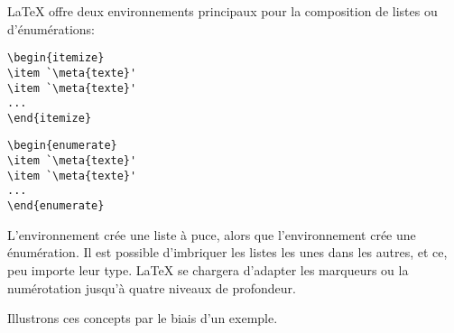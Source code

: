 {\LaTeX} offre deux environnements principaux pour la composition de
listes ou d'énumérations:
\begin{demo}
  \begin{minipage}{0.48\linewidth}
\begin{lstlisting}
\begin{itemize}
\item `\meta{texte}'
\item `\meta{texte}'
...
\end{itemize}
\end{lstlisting}
  \end{minipage}
  \hfill
  \begin{minipage}{0.48\linewidth}
\begin{lstlisting}
\begin{enumerate}
\item `\meta{texte}'
\item `\meta{texte}'
...
\end{enumerate}
\end{lstlisting}
  \end{minipage}
\end{demo}
L'environnement  crée une liste à puce, alors que
l'environnement  crée une énumération. Il est possible
d'imbriquer les listes les unes dans les autres, et ce, peu importe
leur type. {\LaTeX} se chargera d'adapter les marqueurs ou la
numérotation jusqu'à quatre niveaux de profondeur.

Illustrons ces concepts par le biais d'un exemple.

